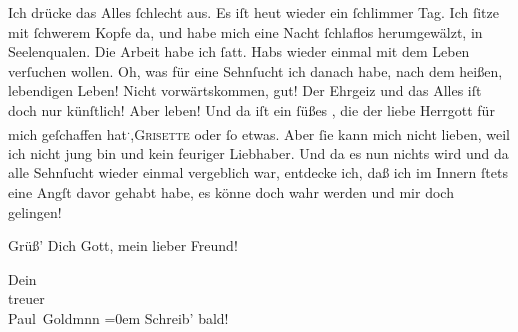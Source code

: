 \pstart
           Ich drücke das Alles{ }ſchlecht aus. Es iſt heut wieder
               ein{ }ſchlimmer Tag. Ich{ }ſitze mit{ }ſchwerem Kopfe da, und habe mich eine Nacht{ }ſchlaflos herumgewälzt, in Seelenqualen. Die Arbeit habe ich{ }ſatt. Habs wieder einmal
               mit dem Leben verſuchen wollen. Oh, was für eine Sehnſucht ich danach habe, nach dem
               heißen, lebendigen {\pb}Leben! Nicht vorwärtskommen,
               gut! Der Ehrgeiz und das Alles iſt doch nur künſtlich! Aber leben! Und da iſt ein{ }ſüßes \label{K_L02758-13v}\label{K_L02758-13}, die der
               liebe Herrgott für mich geſchaffen hat\substVorne{}\textsuperscript{.}\substDazwischen{},\substHinten{}{ }\textsc{Grisette} oder{ }ſo etwas. Aber{ }ſie kann mich nicht lieben, weil ich nicht jung bin und
               kein feuriger Liebhaber. Und da es nun nichts wird und da alle Sehnſucht wieder
               einmal vergeblich war, entdecke ich, daß ich im Innern{ }ſtets eine Angſt davor {\pb}gehabt habe, es könne doch wahr werden und mir doch
                  gelingen! {\dotsfour}\pend
           
\pstart
           Grüß’ Dich Gott, mein lieber Freund!\pend
           
\pstart
           Dein {\\[\baselineskip]}treuer {\\[\baselineskip]}\spacefill\mbox{Paul Goldmnn}\pend
           \leftskip=0em{}
\pstart
           \noindent{}Schreib’ bald!\pend
           \endnumbering{}  \newcommand{\dateiname}{L02758}\newcommand{\titel}{Paul Goldmann an Arthur Schnitzler, 5. 12. [1895]}\newcommand{\editorInnen}{Martin Anton Müller und Laura Untner}
